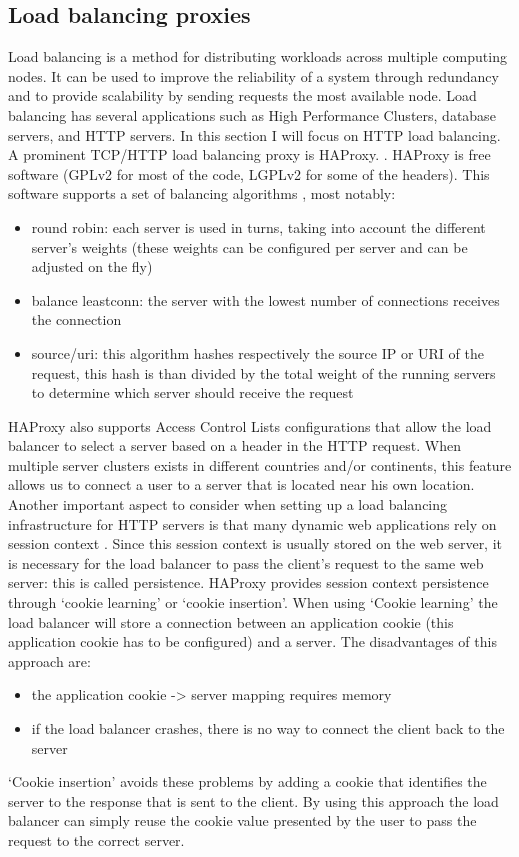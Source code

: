 \documentclass[12pt]{report}
\begin{document}
\subsection{Load balancing proxies}
\label{sec:load_balancing_proxies}
Load balancing is a method for distributing workloads across multiple
computing nodes. It can be used to improve the reliability of a system through
redundancy and to provide scalability by sending requests the most
available node.
Load balancing has several applications such as High Performance
Clusters, database servers, and HTTP servers. In this section I will
focus on HTTP load balancing.
A prominent TCP/HTTP load balancing proxy is HAProxy.
\cite{haproxy:2013}. HAProxy is free software (GPLv2 for most of the
code, LGPLv2 for some of the headers). This software supports a set of
balancing algorithms \cite{tarreau:2006}, most notably:
\begin{itemize}
  \item round robin: each server is used in turns, taking into account
    the different server's weights (these weights can be configured
    per server and can be adjusted on the fly)
  \item balance leastconn: the server with the lowest number of connections receives the connection
  \item source/uri: this algorithm hashes respectively the source IP
    or URI of the request, this hash is than divided by the total
    weight of the running servers to determine which server should
    receive the request
\end{itemize}
HAProxy also supports Access Control Lists configurations that allow
the load balancer to select a server based on a header in the HTTP
request. When multiple server clusters exists in different countries
and/or continents, this feature allows us to connect a user to a
server that is located near his own location.
Another important aspect to consider when setting up a load balancing
infrastructure for HTTP servers is that many dynamic web applications
rely on session context \cite{tarreau:2006}. Since this session context is usually stored
on the web server, it is necessary for the load balancer to pass the
client's request to the same web server: this is called persistence.
HAProxy provides session context persistence through `cookie
learning' or `cookie insertion'. When using `Cookie learning' the load
balancer will store a connection between an application cookie (this
application cookie has to be configured) and a server. The
disadvantages of this approach are:
\begin{itemize}
  \item the application cookie -> server mapping requires memory
  \item if the load balancer crashes, there is no way to connect the
    client back to the server
\end{itemize}
`Cookie insertion' avoids these problems by adding a cookie that
identifies the server to the response that is sent to the client. By
using this approach the load balancer can simply reuse the
cookie value presented by the user to pass the request to the correct
server.
\end{document}
